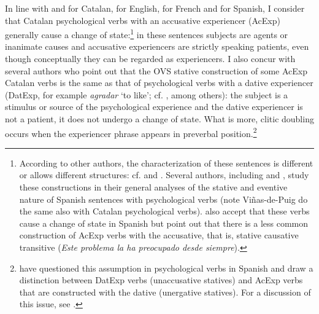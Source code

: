 \documentclass[output=paper,colorlinks,citecolor=brown,modfonts,nonflat]{langsci/langscibook}
\begin{document}
In line with \citet{Ynglès1991, CabréMateu1998, Rossello2008} and \citet[Section 21.5b-c]{GIEC2016} for Catalan, \citet{Pesetsky1995} for English, \citet{Bouchard1995} for French and \citet{Acedo-MatellánMateu2015} for Spanish, I consider that Catalan psychological verbs with an accusative experiencer (AcExp) generally cause a change of state:\footnote{According to other authors, the characterization of these sentences is different or allows different structures: cf. \citet{vanVoorst1992,Arad1999,Landau2010,MarínMcNally2011} and \citet{Fabregas2015experimentante}. Several authors, including \citet{FabregasMarín2012,FábregasMarínMcNally2012,MarínSanchezMarco2012,Ganeshan2014} and \citet{Viñas-de-Puig2014}, study these constructions in their general analyses of the stative and eventive nature of Spanish sentences with psychological verbs (note Viñas-de-Puig do the same also with Catalan psychological verbs). \citet[83 (4)]{Acedo-MatellánMateu2015} also accept that these verbs cause a change of state in Spanish but point out that there is a less common construction of AcExp verbs with the accusative, that is, stative causative transitive (\textit{Este problema la ha preocupado desde siempre}).} in these sentences subjects are agents or inanimate causes and accusative experiencers are strictly speaking patients, even though conceptually they can be regarded as experiencers. I also concur with several authors who point out that the OVS stative construction of some AcExp Catalan verbs is the same as that of psychological verbs with a dative experiencer (DatExp, for example \textit{agradar} ‘to like’; cf. \citealt{CabréMateu1998, Ramos2004, Rossello2008, Cuervo2010Cuestiones}, among others): the subject is a stimulus or source of the psychological experience and the dative experiencer is not a patient, it does not undergo a change of state. What is more, clitic doubling occurs when the experiencer phrase appears in preverbal position.\footnote{\citet{Acedo-MatellánMateu2015} have questioned this assumption in psychological verbs in Spanish and draw a distinction between DatExp verbs (unaccusative statives) and AcExp verbs that are constructed with the dative (unergative statives). For a discussion of this issue, see \citet[Section 6.2.4.1]{Royo2017}.}
\end{document}
